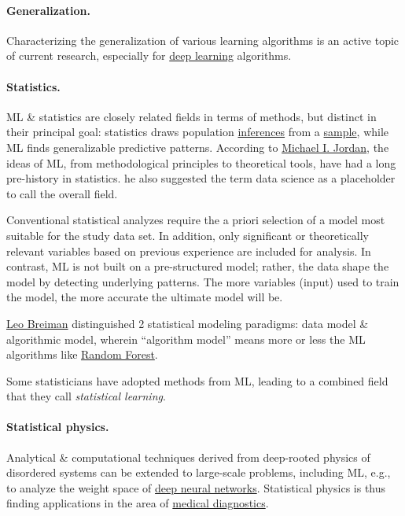 \documentclass{article}
\begin{document}
\paragraph{Generalization.} Characterizing the generalization of various learning algorithms is an active topic of current research, especially for \href{https://en.wikipedia.org/wiki/Deep_learning}{deep learning} algorithms.

\paragraph{Statistics.} ML \& statistics are closely related fields in terms of methods, but distinct in their principal goal: statistics draws population \href{https://en.wikipedia.org/wiki/Statistical_inference}{inferences} from a \href{https://en.wikipedia.org/wiki/Sample_(statistics)}{sample}, while ML finds generalizable predictive patterns. According to \href{https://en.wikipedia.org/wiki/Michael_I._Jordan}{Michael I. Jordan}, the ideas of ML, from methodological principles to theoretical tools, have had a long pre-history in statistics. he also suggested the term data science as a placeholder to call the overall field.

Conventional statistical analyzes require the a priori selection of a model most suitable for the study data set. In addition, only significant or theoretically relevant variables based on previous experience are included for analysis. In contrast, ML is not built on a pre-structured model; rather, the data shape the model by detecting underlying patterns. The more variables (input) used to train the model, the more accurate the ultimate model will be.

\href{https://en.wikipedia.org/wiki/Leo_Breiman}{Leo Breiman} distinguished 2 statistical modeling paradigms: data model \& algorithmic model, wherein ``algorithm model'' means more or less the ML algorithms like \href{https://en.wikipedia.org/wiki/Random_forest}{Random Forest}.

Some statisticians have adopted methods from ML, leading to a combined field that they call {\it statistical learning}.

\paragraph{Statistical physics.} Analytical \& computational techniques derived from deep-rooted physics of disordered systems can be extended to large-scale problems, including ML, e.g., to analyze the weight space of \href{https://en.wikipedia.org/wiki/Deep_neural_network}{deep neural networks}. Statistical physics is thus finding applications in the area of \href{https://en.wikipedia.org/wiki/Medical_diagnostics}{medical diagnostics}.
\end{document}
